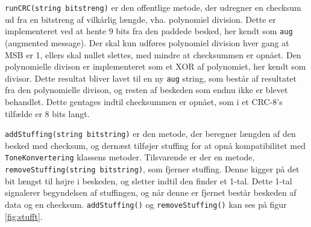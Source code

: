 \newline
\texttt{runCRC(string bitstreng)} er den offentlige metode, der udregner en checksum ud fra en bitstreng af vilkårlig længde, vha. polynomiel division. Dette er implementeret ved at hente 9 bits fra den paddede besked, her kendt som \texttt{aug} (augmented message). Der skal kun udføres polynomiel division hver gang at MSB er 1, ellers skal nullet slettes, med mindre at checksummen er opnået. Den polynomielle divison er implementeret som et XOR af polynomiet, her kendt som divisor. Dette resultat bliver lavet til en ny \texttt{aug} string, som består af resultatet fra den polynomielle divison, og resten af beskeden som endnu ikke er blevet behandlet. Dette gentages indtil checksummen er opnået, som i et CRC-8’s tilfælde er 8 bits langt.
\hfill \break

\texttt{addStuffing(\textcolor{dkgreen}{string} bitstring)} er den metode, der beregner længden af den besked med checksum, og dernæst tilføjer stuffing for at opnå kompatibilitet med \texttt{ToneKonvertering} klassens metoder. Tilsvarende er der en metode, \texttt{removeStuffing(\textcolor{dkgreen}{string} bitstring)}, som fjerner stuffing. Denne kigger på det bit længst til højre i beskeden, og sletter indtil den finder et 1-tal. Dette 1-tal signalerer begyndelsen af stuffingen, og når denne er fjernet består beskeden af data og en checksum. \texttt{addStuffing()} og \texttt{removeStuffing()} kan ses på figur \ref{fig:stufft}.
